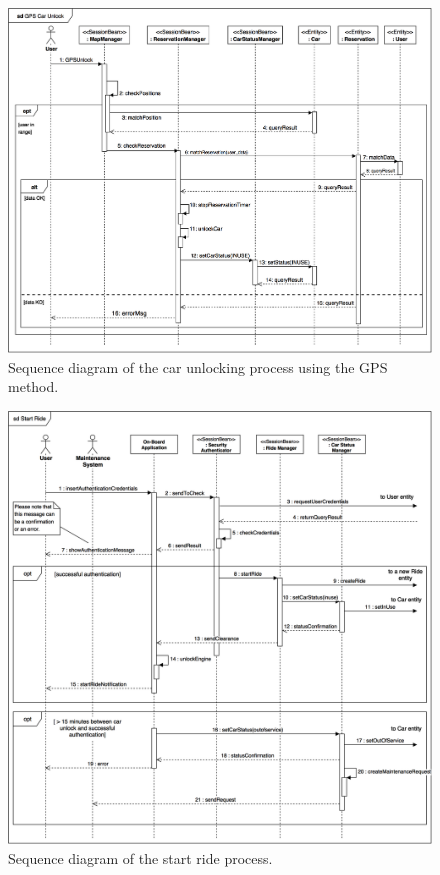 \begin{figure}[H]
\begin{center}
		\includegraphics[width=\textwidth]{./arch_design/diagrams/gps_unlock_sd.png}
		\caption{Sequence diagram of the car unlocking process using the GPS method.}
		\label{gps_unlock_sd}
\end{center}
\end{figure}

\begin{figure}[H]
\begin{center}
		\includegraphics[width=\textwidth]{./arch_design/diagrams/start_ride_sd.png}
		\caption{Sequence diagram of the start ride process.}
		\label{start_ride_sd}
\end{center}
\end{figure}